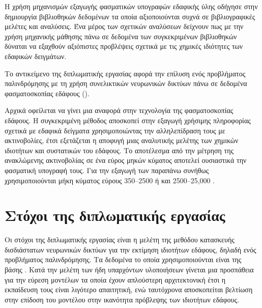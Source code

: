Η χρήση μηχανισμών εξαγωγής φασματικών υπογραφών εδαφικής ύλης οδήγησε στην δημιουργία βιβλιοθηκών δεδομένων τα οποία αξιοποιούνται συχνά σε βιβλιογραφικές μελέτες και αναλύσεις. Ένα μέρος των σχετικών αναλύσεων δείχνουν πως με την χρήση μηχανικής μάθησης πάνω σε δεδομένα των συγκεκριμένων βιβλιοθηκών δύναται να εξαχθούν αξιόπιστες προβλέψεις σχετικά με τις χημικές ιδιότητες των εδαφικών δειγμάτων.

Το αντικείμενο της διπλωματικής εργασίας αφορά την επίλυση ενός προβλήματος παλινδρόμησης με τη χρήση συνελικτικών νευρωνικών δικτύων πάνω σε δεδομένα φασματοσκοπίας εδάφους ().

Αρχικά οφείλεται να γίνει μια αναφορά στην τεχνολογία της φασματοσκοπίας εδάφους. Η συγκεκριμένη μέθοδος αποσκοπεί στην εξαγωγή χρήσιμης πληροφορίας σχετικά με εδαφικά δείγματα χρησιμοποιώντας την αλληλεπίδραση τους με ακτινοβολίες, έτσι εξετάζεται η αποφυγή μιας αναλυτικής μελέτης των χημικών ιδιοτήτων και συστατικών του εδάφους. Το αποτέλεσμα από την μέτρηση της ανακλώμενης ακτινοβολίας σε ένα εύρος μηκών κύματος αποτελεί ουσιαστικά την φασματική υπογραφή τους. Για την εξαγωγή των παραπάνω συνήθως χρησιμοποιούνται μήκη κύματος εύρους 350–2500  ή και 2500–25,000 .

\section{Στόχοι της διπλωματικής εργασίας}
Οι στόχοι της διπλωματικής εργασίας είναι η μελέτη της μεθόδου κατασκευής δισδιάστατων νευρωνικών δικτύων για την εκτίμηση ιδιοτήτων εδάφους, δηλαδή ενός προβλήματος παλινδρόμησης. Τα δεδομένα το οποία χρησιμοποιούνται είναι της βάσης  \cite{lucas_soil}. Κατά την μελέτη των ήδη υπαρχόντων υλοποιήσεων γίνεται μια προσπάθεια για την εύρεση μοντέλων τα οποία έχουν απλούστερη αρχιτεκτονική έτσι η εκπαίδευση τους είναι λιγότερο απαιτητική, ενώ ταυτόχρονα αποσκοπείται βελτίωση στην επίδοση του μοντέλου στην ικανότητα πρόβλεψης των ιδιοτήτων εδάφους. 

